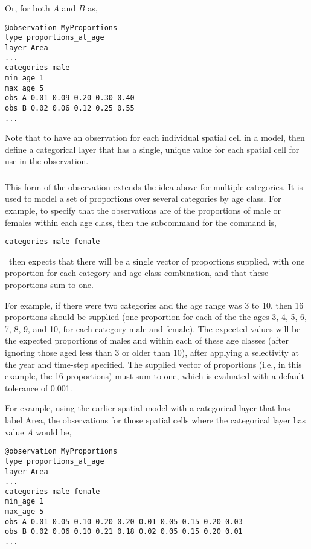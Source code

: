 Or, for both $A$ and $B$ as,

{\small{\begin{verbatim}
@observation MyProportions
type proportions_at_age
layer Area
...
categories male
min_age 1
max_age 5
obs A 0.01 0.09 0.20 0.30 0.40
obs B 0.02 0.06 0.12 0.25 0.55
...
\end{verbatim}

Note that to have an observation for each individual spatial cell in a model, then define a categorical layer that has a single, unique value for each spatial cell for use in the observation. 

\subsubsection*{}

This form of the observation extends the idea above for multiple categories. It is used to model a set of proportions over several categories by age class. For example, to specify that the observations are of the proportions of male or females within each age class, then the subcommand  for the  command is,

{\small{\begin{verbatim}
categories male female
\end{verbatim}}}

\SPM\ then expects that there will be a single vector of proportions supplied, with one proportion for each category and age class combination, and that these proportions sum to one. 

For example, if there were two categories and the age range was 3 to 10, then 16 proportions should be supplied (one proportion for each of the the ages 3, 4, 5, 6, 7, 8, 9, and 10, for each category male and female). The expected values will be the expected proportions of males and within each of these age classes (after ignoring those aged less than 3 or older than 10), after applying a selectivity at the year and time-step specified. The supplied vector of proportions (i.e., in this example, the 16 proportions) must sum to one, which is evaluated with a default tolerance of 0.001. 

For example, using the earlier spatial model with a categorical layer that has label Area, the observations for those spatial cells where the categorical layer has value $A$ would be, 

{\small{\begin{verbatim}
@observation MyProportions
type proportions_at_age
layer Area
...
categories male female
min_age 1
max_age 5
obs A 0.01 0.05 0.10 0.20 0.20 0.01 0.05 0.15 0.20 0.03
obs B 0.02 0.06 0.10 0.21 0.18 0.02 0.05 0.15 0.20 0.01
...
\end{verbatim}

}}}}

